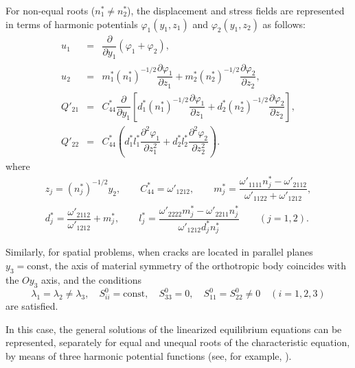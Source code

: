 For non-equal roots ($n_1^* \neq n_2^*$), the displacement and stress fields are represented in terms of harmonic potentials
$\varphi_1(y_1,z_1)$ and $\varphi_2(y_1,z_2)$ as follows:
\begin{equation}
	\label{BogdanovGuzEq11}
	\begin{array}{rcl}
		u_1
		&=&
		\dfrac{\partial}{\partial y_1}
		\left(\varphi_1+\varphi_2\right), \\[8pt]
		
		u_2
		&=&
		m_1^*(n_1^*)^{-1/2}
		\dfrac{\partial \varphi_1}{\partial z_1}
		+
		m_2^*(n_2^*)^{-1/2}
		\dfrac{\partial \varphi_2}{\partial z_2}, \\[10pt]
		
		Q'_{21}
		&=&
		C_{44}^*
		\dfrac{\partial}{\partial y_1}
		\left[
		d_1^*(n_1^*)^{-1/2}
		\dfrac{\partial \varphi_1}{\partial z_1}
		+
		d_2^*(n_2^*)^{-1/2}
		\dfrac{\partial \varphi_2}{\partial z_2}
		\right], \\[10pt]
		
		Q'_{22}
		&=&
		C_{44}^*
		\left(
		d_1^* l_1^*
		\dfrac{\partial^2 \varphi_1}{\partial z_1^2}
		+
		d_2^* l_2^*
		\dfrac{\partial^2 \varphi_2}{\partial z_2^2}
		\right).
	\end{array}
\end{equation}
%
where
\begin{equation}
	\label{BogdanovGuzEq12}
	\begin{array}{c}
		z_j
		=
		(n_j^*)^{-1/2} y_2, \qquad
		C_{44}^*
		=
		\omega'_{1212}, \qquad
		m_j^*
		=
		\dfrac{\omega'_{1111} n_j^* - \omega'_{2112}}
		{\omega'_{1122} + \omega'_{1212}}, 
		\\
		d_j^*
		=
		\dfrac{\omega'_{2112}}{\omega'_{1212}}
		+
		m_j^*, \qquad		
		l_j^*
		=
		\dfrac{\omega'_{2222} m_j^* - \omega'_{2211} n_j^*}
		{\omega'_{1212} d_j^* n_j^*}
		\qquad (j=1,2).
	\end{array}
\end{equation}

Similarly, for spatial problems, when cracks are located in parallel planes $y_3=\mathrm{const}$, the axis of material symmetry of the orthotropic body coincides with the $O y_3$ axis, and the conditions
\begin{equation}
	\label{BogdanovGuzEq13}
	\lambda_1=\lambda_2\neq\lambda_3,
	\quad
	S_{ii}^0=\mathrm{const},
	\quad
	S_{33}^0=0,
	\quad
	S_{11}^0=S_{22}^0\neq 0
	\quad (i=1,2,3)
\end{equation}
are satisfied. 

In this case, the general solutions of the linearized equilibrium equations can be represented, separately for equal and unequal roots of the characteristic equation, by means of three harmonic potential functions (see, for example, \cite{BogdanovGuz28,BogdanovGuz32}). 

